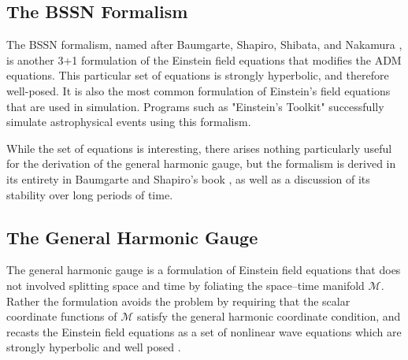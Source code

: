 \documentclass[11pt]{article}
\numberwithin{equation}{section}
\begin{document}
\subsection{The BSSN Formalism}
The BSSN formalism, named after Baumgarte, Shapiro, Shibata, and Nakamura \cite{baumgarte_shapiro_2010}, is another 3+1 formulation of the Einstein field equations that modifies the ADM equations. This particular set of equations is strongly hyperbolic, and therefore well-posed. It is also the most common formulation of Einstein's field equations that are used in simulation. Programs such as "Einstein's Toolkit" successfully simulate astrophysical events using this formalism. 

While the set of equations is interesting, there arises nothing particularly useful for the derivation of the general harmonic gauge, but the formalism is derived in its entirety in Baumgarte and Shapiro's book \cite{baumgarte_shapiro_2010}, as well as a discussion of its stability over long periods of time. 

\subsection{The General Harmonic Gauge}
The general harmonic gauge is a formulation of Einstein field equations that does not involved splitting space and time by foliating the space--time manifold $\mathcal{M}$. Rather the formulation avoids the problem by requiring that the scalar coordinate functions of $\mathcal{M}$ satisfy the general harmonic coordinate condition, and recasts the Einstein field equations as a set of nonlinear wave equations which are strongly hyperbolic and well posed \cite{gundlach}.
\end{document}
